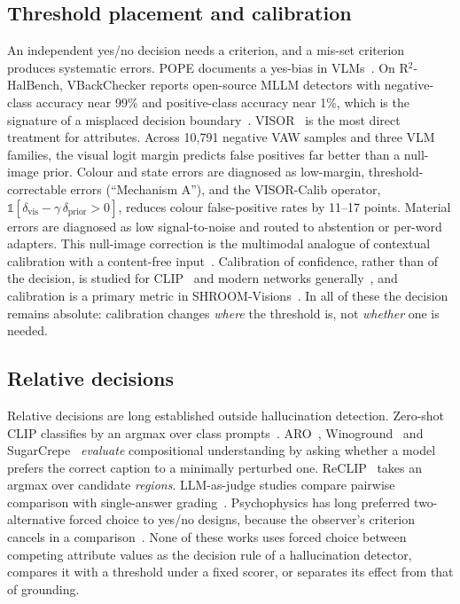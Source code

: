 \documentclass[11pt]{article}
\begin{document}
\subsection{Threshold placement and calibration}
An independent yes/no decision needs a criterion, and a mis-set criterion produces systematic errors. POPE documents a yes-bias in VLMs~\cite{li2023pope}. On R$^2$-HalBench, VBackChecker reports open-source MLLM detectors with negative-class accuracy near 99\% and positive-class accuracy near 1\%, which is the signature of a misplaced decision boundary~\cite{guo2026vbackchecker}. VISOR~\cite{zhang2026visor} is the most direct treatment for attributes. Across 10{,}791 negative VAW samples and three VLM families, the visual logit margin predicts false positives far better than a null-image prior. Colour and state errors are diagnosed as low-margin, threshold-correctable errors (``Mechanism A''), and the VISOR-Calib operator, $\mathbb{1}[\delta_{\mathrm{vis}}-\gamma\,\delta_{\mathrm{prior}}>0]$, reduces colour false-positive rates by 11--17 points. Material errors are diagnosed as low signal-to-noise and routed to abstention or per-word adapters. This null-image correction is the multimodal analogue of contextual calibration with a content-free input~\cite{zhao2021calibrate,fei2023labelbias}. Calibration of confidence, rather than of the decision, is studied for CLIP~\cite{levine2023clipcalib} and modern networks generally~\cite{guo2017calibration}, and calibration is a primary metric in SHROOM-Visions~\cite{vazquez2026shroomvisions,abebe2026spancalib}. In all of these the decision remains absolute: calibration changes \emph{where} the threshold is, not \emph{whether} one is needed.

\subsection{Relative decisions}
Relative decisions are long established outside hallucination detection. Zero-shot CLIP classifies by an argmax over class prompts~\cite{radford2021clip}. ARO~\cite{yuksekgonul2023bow}, Winoground~\cite{thrush2022winoground} and SugarCrepe~\cite{hsieh2023sugarcrepe} \emph{evaluate} compositional understanding by asking whether a model prefers the correct caption to a minimally perturbed one. ReCLIP~\cite{subramanian2022reclip} takes an argmax over candidate \emph{regions}. LLM-as-judge studies compare pairwise comparison with single-answer grading~\cite{zheng2023judging}. Psychophysics has long preferred two-alternative forced choice to yes/no designs, because the observer's criterion cancels in a comparison~\cite{green1966sdt,macmillan2005detection}. None of these works uses forced choice between competing attribute values as the decision rule of a hallucination detector, compares it with a threshold under a fixed scorer, or separates its effect from that of grounding.
\end{document}
